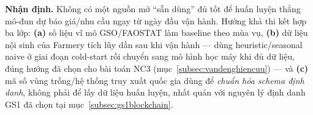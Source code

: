 \noindent\textbf{Nhận định.} Không có một nguồn mở ``sẵn dùng'' đủ tốt để huấn luyện thẳng mô-đun dự báo giá/nhu cầu ngay từ ngày đầu vận hành. Hướng khả thi kết hợp ba lớp: \textbf{(a)} số liệu vĩ mô GSO/FAOSTAT làm baseline theo mùa vụ, \textbf{(b)} dữ liệu nội sinh của Farmery tích lũy dần sau khi vận hành --- dùng heuristic/seasonal naive ở giai đoạn cold-start rồi chuyển sang mô hình học máy khi đủ dữ liệu, đúng hướng đã chọn cho bài toán NC3 (mục~\ref{subsec:vandenghiencuu}) --- và \textbf{(c)} mã số vùng trồng/hệ thống truy xuất quốc gia dùng để \emph{chuẩn hóa schema định danh}, không phải để lấy dữ liệu huấn luyện, nhất quán với nguyên lý định danh GS1 đã chọn tại mục~\ref{subsec:gs1blockchain}.

%
%
%
%

